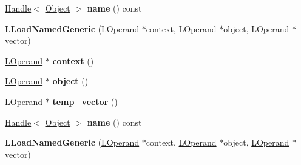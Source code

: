 \begin{DoxyCompactItemize}
\item 
\hyperlink{classv8_1_1internal_1_1_handle}{Handle}$<$ \hyperlink{classv8_1_1internal_1_1_object}{Object} $>$ {\bfseries name} () const \hypertarget{classv8_1_1internal_1_1_l_load_named_generic_a328fcd03d981c29639521ee005f3adc7}{}\label{classv8_1_1internal_1_1_l_load_named_generic_a328fcd03d981c29639521ee005f3adc7}

\item 
{\bfseries L\+Load\+Named\+Generic} (\hyperlink{classv8_1_1internal_1_1_l_operand}{L\+Operand} $\ast$context, \hyperlink{classv8_1_1internal_1_1_l_operand}{L\+Operand} $\ast$object, \hyperlink{classv8_1_1internal_1_1_l_operand}{L\+Operand} $\ast$vector)\hypertarget{classv8_1_1internal_1_1_l_load_named_generic_a6994bc2c7c479c721ec11114ed19423c}{}\label{classv8_1_1internal_1_1_l_load_named_generic_a6994bc2c7c479c721ec11114ed19423c}

\item 
\hyperlink{classv8_1_1internal_1_1_l_operand}{L\+Operand} $\ast$ {\bfseries context} ()\hypertarget{classv8_1_1internal_1_1_l_load_named_generic_a61d03d8bff411819ec103caee4b20d95}{}\label{classv8_1_1internal_1_1_l_load_named_generic_a61d03d8bff411819ec103caee4b20d95}

\item 
\hyperlink{classv8_1_1internal_1_1_l_operand}{L\+Operand} $\ast$ {\bfseries object} ()\hypertarget{classv8_1_1internal_1_1_l_load_named_generic_ac545174d6ce0223254278aa25992bcf1}{}\label{classv8_1_1internal_1_1_l_load_named_generic_ac545174d6ce0223254278aa25992bcf1}

\item 
\hyperlink{classv8_1_1internal_1_1_l_operand}{L\+Operand} $\ast$ {\bfseries temp\+\_\+vector} ()\hypertarget{classv8_1_1internal_1_1_l_load_named_generic_ac71e90a4f4d755276a1d76ac24d4ef3d}{}\label{classv8_1_1internal_1_1_l_load_named_generic_ac71e90a4f4d755276a1d76ac24d4ef3d}

\item 
\hyperlink{classv8_1_1internal_1_1_handle}{Handle}$<$ \hyperlink{classv8_1_1internal_1_1_object}{Object} $>$ {\bfseries name} () const \hypertarget{classv8_1_1internal_1_1_l_load_named_generic_a328fcd03d981c29639521ee005f3adc7}{}\label{classv8_1_1internal_1_1_l_load_named_generic_a328fcd03d981c29639521ee005f3adc7}

\item 
{\bfseries L\+Load\+Named\+Generic} (\hyperlink{classv8_1_1internal_1_1_l_operand}{L\+Operand} $\ast$context, \hyperlink{classv8_1_1internal_1_1_l_operand}{L\+Operand} $\ast$object, \hyperlink{classv8_1_1internal_1_1_l_operand}{L\+Operand} $\ast$vector)\hypertarget{classv8_1_1internal_1_1_l_load_named_generic_a6994bc2c7c479c721ec11114ed19423c}{}\label{classv8_1_1internal_1_1_l_load_named_generic_a6994bc2c7c479c721ec11114ed19423c}


\end{DoxyCompactItemize}
